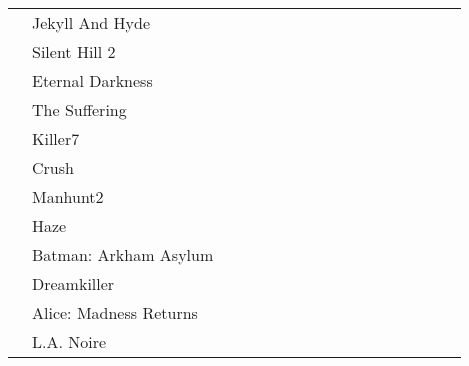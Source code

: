 \documentclass[twoside]{tfg-urjc}
\begin{document}
\begin{landscape}
\begin{longtable}{l  l  *{15}{c} }
                      & Jekyll And Hyde		     &      &      &        &       &                      &                   &                   &                   &                   \\
                      & Silent Hill 2		     &      &      &        &       &                      &                   &                   &                   &                   \\
                      & Eternal Darkness	     &      &      &        &       &                      &                   &                   &                   &                   \\
                      & The Suffering		     &      &      &        &       &                      &                   &                   &                   &                   \\
                      & Killer7			     &      &      &        &       &                      &                   &                   &                   &                   \\
                      & Crush			     &      &      &        &       &                      &                   &                   &                   &                   \\
                      & Manhunt2		     &      &      &        &       &                      &                   &                   &                   &                   \\
                      & Haze			     &      &      &        &       &                      &                   &                   &                   &                   \\
                      & Batman: Arkham Asylum	     &      &      &        &       &                      &                   &                   &                   &                   \\
                      & Dreamkiller		     &      &      &        &       &                      &                   &                   &                   &                   \\
                      & Alice: Madness Returns	     &      &      &        &       &                      &                   &                   &                   &                   \\
                      & L.A. Noire	      	     &      &      &        &       &                      &                   &                   &                   &                   \\

\end{longtable}
\end{landscape}
\end{document}

